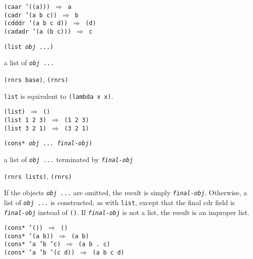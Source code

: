 \begin{alltt}
(caar '((a))) \(\Rightarrow\) a
(cadr '(a b c)) \(\Rightarrow\) b
(cdddr '(a b c d)) \(\Rightarrow\) (d)
(cadadr '(a (b c))) \(\Rightarrow\) c
\end{alltt}

\begin{description}

\label{objects_s43}\item[procedure] \texttt{(list \textit{obj} ...)}



\item[returns] a list of \texttt{\textit{obj} ...}


\item[libraries] \texttt{(rnrs base)}, \texttt{(rnrs)}
\end{description}

\texttt{list} is equivalent to \texttt{(lambda x x)}.

\begin{alltt}
(list) \(\Rightarrow\) ()
(list 1 2 3) \(\Rightarrow\) (1 2 3)
(list 3 2 1) \(\Rightarrow\) (3 2 1)
\end{alltt}

\begin{description}

\label{objects_s44}\item[procedure] \texttt{(cons* \textit{obj} ... \textit{final-obj})}



\item[returns] a list of \texttt{\textit{obj} ...} terminated by \texttt{\textit{final-obj}}


\item[libraries] \texttt{(rnrs lists)}, \texttt{(rnrs)}
\end{description}


If the objects \texttt{\textit{obj} ...} are omitted, the result is simply
\texttt{\textit{final-obj}}.
Otherwise, a list of \texttt{\textit{obj} ...} is constructed, as with \texttt{list}, except
that the final cdr field is \texttt{\textit{final-obj}} instead of \texttt{()}.
If \texttt{\textit{final-obj}} is not a list, the result is an improper list.


\begin{alltt}
(cons* '()) \(\Rightarrow\) ()
(cons* '(a b)) \(\Rightarrow\) (a b)
(cons* 'a 'b 'c) \(\Rightarrow\) (a b . c)
(cons* 'a 'b '(c d)) \(\Rightarrow\) (a b c d)
\end{alltt}

